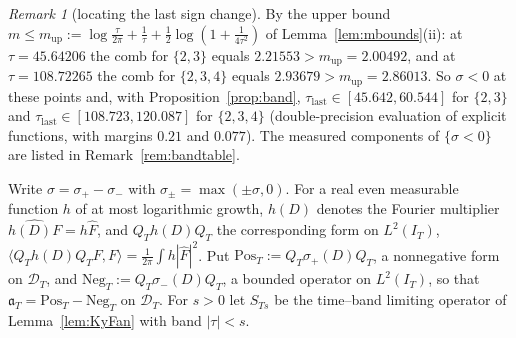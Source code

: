 \documentclass[11pt]{amsart}
\theoremstyle{definition}
\theoremstyle{remark}
\newtheorem{remark}[theorem]{Remark}
\newcommand{\IT}{I_T}
\newcommand{\Fh}{\widehat F}
\begin{document}
\begin{remark}[locating the last sign change]\label{rem:taulast}
By the upper bound $m\le m_{\mathrm{up}}:=\log\frac\tau{2\pi}+\frac1\tau+\frac12\log(1+\frac1{4\tau^2})$ of
Lemma~\ref{lem:mbounds}(ii): at $\tau=45.64206$ the comb for $\{2,3\}$ equals $2.21553>m_{\mathrm{up}}=2.00492$,
and at $\tau=108.72265$ the comb for $\{2,3,4\}$ equals $2.93679>m_{\mathrm{up}}=2.86013$. So $\sigma<0$ at these
points and, with Proposition~\ref{prop:band}, $\tau_{\mathrm{last}}\in[45.642,60.544]$ for $\{2,3\}$ and
$\tau_{\mathrm{last}}\in[108.723,120.087]$ for $\{2,3,4\}$ (double-precision evaluation of explicit functions, with
margins $0.21$ and $0.077$). The measured components of $\{\sigma<0\}$ are listed in Remark~\ref{rem:bandtable}.
\end{remark}

Write $\sigma=\sigma_+-\sigma_-$ with $\sigma_\pm=\max(\pm\sigma,0)$. For a real even measurable function $h$ of at
most logarithmic growth, $h(D)$ denotes the Fourier multiplier $\widehat{h(D)F}=h\Fh$, and $Q_Th(D)Q_T$ the
corresponding form on $L^2(\IT)$, $\langle Q_Th(D)Q_TF,F\rangle=\frac1{2\pi}\int h|\Fh|^2$. Put
$\mathrm{Pos}_T:=Q_T\sigma_+(D)Q_T$, a nonnegative form on $\mathcal D_T$, and
$\mathrm{Neg}_T:=Q_T\sigma_-(D)Q_T$, a bounded operator on $L^2(\IT)$, so that $\mathfrak a_T=\mathrm{Pos}_T-\mathrm{Neg}_T$ on $\mathcal D_T$. For $s>0$ let $S_{Ts}$ be the time--band limiting
operator of Lemma~\ref{lem:KyFan} with band $|\tau|<s$.
\end{document}
